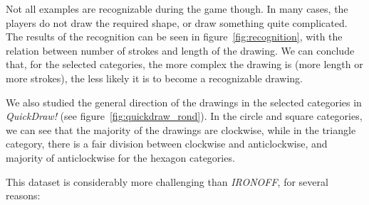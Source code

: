 \par Not all examples are recognizable during the game though. In many cases, the players do not draw the required shape, or draw something quite complicated. The results of the recognition can be seen in figure~\ref{fig:recognition}, with the relation between number of strokes and length of the drawing. We can conclude that, for the selected categories, the more complex the drawing is (more length or more strokes), the less likely it is to become a recognizable drawing.

\par We also studied the general direction of the drawings in the selected categories in \textit{QuickDraw!} (see figure~\ref{fig:quickdraw_rond}). In the circle and square categories, we can see that the majority of the drawings are clockwise, while in the triangle category, there is a fair division between clockwise and anticlockwise, and majority of anticlockwise for the hexagon categories.

\par This dataset is considerably more challenging than \textit{IRONOFF}, for several reasons:

